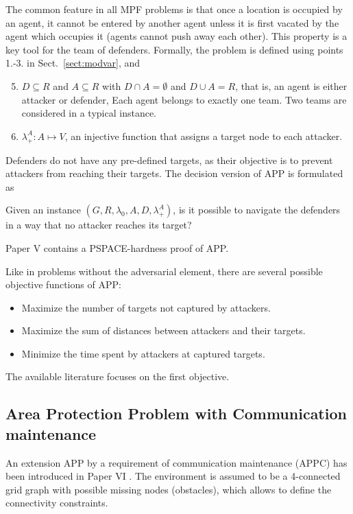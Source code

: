 The common feature in all MPF problems is that once a location is occupied by an agent, 
it cannot be entered by another agent unless it is first vacated by the agent which occupies it (agents cannot push away each other). 
This property is a key tool for the team of defenders.
Formally, the problem is defined using points 1.-3. in Sect.~\ref{sect:modvar}, and
\begin{enumerate}
	\setcounter{enumi}{4}
	\item $D\subseteq R$ and $A\subseteq R$ with $D\cap A=\emptyset$ and $D\cup A=R$, that is, an agent is either attacker or defender,
		Each agent belongs to exactly one team. 
		Two teams are considered in a typical instance. 
	\item $\lambda_+^A:A\mapsto V$, an injective function that assigns a target node to each attacker.
\end{enumerate}

Defenders do not have any pre-defined targets, as their objective is to prevent attackers from reaching their targets.
The decision version of APP is formulated as 
\begin{problem}\label{prob:app}
	Given an instance $(G,R,\lambda_0,A, D, \lambda_+^A)$, is it possible to navigate the defenders in a way that no attacker reaches its target?
\end{problem}
Paper V \cite{ivanova18a} contains a PSPACE-hardness proof of APP.

Like in problems without the adversarial element, there are several possible objective functions of APP:
\begin{itemize}
        \item Maximize the number of targets not captured by attackers.
        \item Maximize the sum of distances between attackers and their targets.
        \item Minimize the time spent by attackers at captured targets.
\end{itemize}
The available literature focuses on the first objective.

\subsection{Area Protection Problem with Communication maintenance}

An extension APP by a requirement of communication maintenance (APPC) has been introduced in Paper VI \cite{ivanova18b}.
The environment is assumed to be a 4-connected grid graph with possible missing nodes (obstacles), which allows to define the connectivity constraints.


